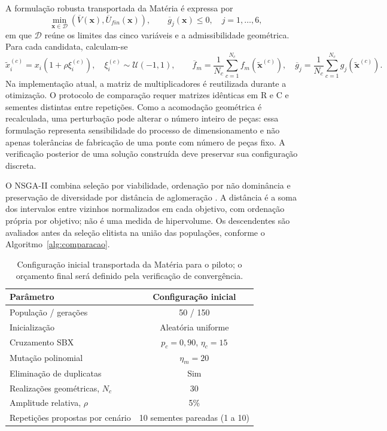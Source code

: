 A formulação robusta transportada da Matéria é expressa por
\begin{equation}
 \min_{\mathbf{x}\in\mathcal D}
 \left(\overline V(\mathbf{x}),\overline U_{fin}(\mathbf{x})\right),
 \qquad \overline g_j(\mathbf{x})\leq0,\quad j=1,\ldots,6,
\label{eq:problema_robusto}
\end{equation}
em que $\mathcal D$ reúne os limites das cinco variáveis e a admissibilidade geométrica. Para cada candidata, calculam-se
\begin{equation}
 \widetilde x_i^{(c)}=x_i(1+\rho\xi_i^{(c)}),\quad
 \xi_i^{(c)}\sim\mathcal U(-1,1),\qquad
 \overline f_m=\frac{1}{N_c}\sum_{c=1}^{N_c}f_m(\widetilde{\mathbf{x}}^{(c)}),\quad
 \overline g_j=\frac{1}{N_c}\sum_{c=1}^{N_c}g_j(\widetilde{\mathbf{x}}^{(c)}).
\label{eq:agregacao_robusta}
\end{equation}
Na implementação atual, a matriz de multiplicadores é reutilizada durante a otimização. O protocolo de comparação requer matrizes idênticas em R e C e sementes distintas entre repetições. Como a acomodação geométrica é recalculada, uma perturbação pode alterar o número inteiro de peças: essa formulação representa sensibilidade do processo de dimensionamento e não apenas tolerâncias de fabricação de uma ponte com número de peças fixo. A verificação posterior de uma solução construída deve preservar sua configuração discreta.

O NSGA-II combina seleção por viabilidade, ordenação por não dominância e preservação de diversidade por distância de aglomeração \parencite{Deb2002}. A distância é a soma dos intervalos entre vizinhos normalizados em cada objetivo, com ordenação própria por objetivo; não é uma medida de hipervolume. Os descendentes são avaliados antes da seleção elitista na união das populações, conforme o Algoritmo~\ref{alg:comparacao}.

\begin{table}[!ht]
\centering
\caption{Configuração inicial transportada da Matéria para o piloto; o orçamento final será definido pela verificação de convergência.}\label{tab:otimizacao_piloto}
\begin{tabular}{lc}
\toprule
Parâmetro & Configuração inicial \\
\midrule
População / gerações & 50 / 150 \\
Inicialização & Aleatória uniforme \\
Cruzamento SBX & $p_c=0{,}90$, $\eta_c=15$ \\
Mutação polinomial & $\eta_m=20$ \\
Eliminação de duplicatas & Sim \\
Realizações geométricas, $N_c$ & 30 \\
Amplitude relativa, $\rho$ & 5\% \\
Repetições propostas por cenário & 10 sementes pareadas (1 a 10) \\
\bottomrule
\end{tabular}
\end{table}

